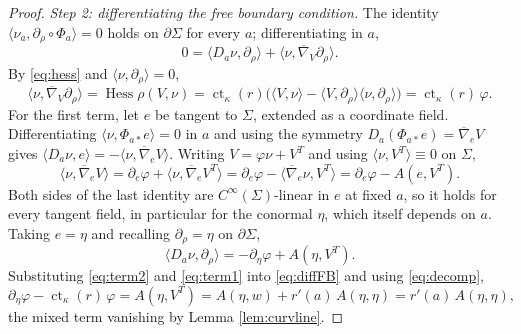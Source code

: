 \documentclass[10pt,a4paper]{amsart}
\newcommand{\ct}{\operatorname{ct}_\kappa}
\newcommand{\Hess}{\operatorname{Hess}}
\newcommand{\bconn}{\overline{\nabla}}
\begin{document}
\begin{proof}
\emph{Step 2: differentiating the free boundary condition.} The identity $\langle\nu_a,\partial_\rho\circ\Phi_a\rangle=0$ holds on $\partial\Sigma$ for every $a$; differentiating in $a$,
\begin{equation}\label{eq:diffFB}
0=\langle D_a\nu,\partial_\rho\rangle+\langle\nu,\bconn_V\partial_\rho\rangle.
\end{equation}
By \eqref{eq:hess} and $\langle\nu,\partial_\rho\rangle=0$,
\begin{equation}\label{eq:term2}
\langle\nu,\bconn_V\partial_\rho\rangle=\Hess\rho(V,\nu)=\ct(r)\bigl(\langle V,\nu\rangle-\langle V,\partial_\rho\rangle\langle\nu,\partial_\rho\rangle\bigr)=\ct(r)\,\varphi.
\end{equation}
For the first term, let $e$ be tangent to $\Sigma$, extended as a coordinate field. Differentiating $\langle\nu,\Phi_{a*}e\rangle=0$ in $a$ and using the symmetry $D_a(\Phi_{a*}e)=\bconn_eV$ gives $\langle D_a\nu,e\rangle=-\langle\nu,\bconn_eV\rangle$. Writing $V=\varphi\nu+V^T$ and using $\langle\nu,V^T\rangle\equiv 0$ on $\Sigma$,
\[
\langle\nu,\bconn_eV\rangle=\partial_e\varphi+\langle\nu,\bconn_eV^T\rangle=\partial_e\varphi-\langle\bconn_e\nu,V^T\rangle=\partial_e\varphi-A(e,V^T).
\]
Both sides of the last identity are $C^\infty(\Sigma)$-linear in $e$ at fixed $a$, so it holds for every tangent field, in particular for the conormal $\eta$, which itself depends on $a$. Taking $e=\eta$ and recalling $\partial_\rho=\eta$ on $\partial\Sigma$,
\begin{equation}\label{eq:term1}
\langle D_a\nu,\partial_\rho\rangle=-\partial_\eta\varphi+A(\eta,V^T).
\end{equation}
Substituting \eqref{eq:term2} and \eqref{eq:term1} into \eqref{eq:diffFB} and using \eqref{eq:decomp},
\[
\partial_\eta\varphi-\ct(r)\,\varphi=A(\eta,V^T)=A(\eta,w)+r'(a)\,A(\eta,\eta)=r'(a)\,A(\eta,\eta),
\]
the mixed term vanishing by Lemma \ref{lem:curvline}.
\end{proof}
\end{document}

